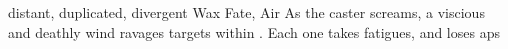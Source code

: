   {distant, duplicated, divergent}%
  {Wax}%
  {Fate, Air}%
  {}%
  {As the caster screams, a viscious and deathly wind ravages  targets within \spellRange.
    Each one takes  \glspl{fatigue}, and loses  \glspl{ap}}%
  {}

